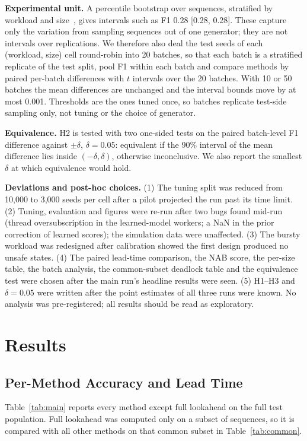 \documentclass[conference]{IEEEtran}
\begin{document}
\textbf{Experimental unit.} A percentile bootstrap over sequences, stratified by workload and size~\cite{Efron1993}, gives intervals such as F1 0.28 [0.28, 0.28]. These capture only the variation from sampling sequences out of one generator; they are not intervals over replications. We therefore also deal the test seeds of each (workload, size) cell round-robin into 20 batches, so that each batch is a stratified replicate of the test split, pool F1 within each batch and compare methods by paired per-batch differences with $t$ intervals over the 20 batches. With 10 or 50 batches the mean differences are unchanged and the interval bounds move by at most 0.001. Thresholds are the ones tuned once, so batches replicate test-side sampling only, not tuning or the choice of generator.

\textbf{Equivalence.} H2 is tested with two one-sided tests on the paired batch-level F1 difference against $\pm\delta$, $\delta=0.05$: equivalent if the 90\% interval of the mean difference lies inside $(-\delta,\delta)$, otherwise inconclusive. We also report the smallest $\delta$ at which equivalence would hold.

\textbf{Deviations and post-hoc choices.} (1) The tuning split was reduced from 10,000 to 3,000 seeds per cell after a pilot projected the run past its time limit. (2) Tuning, evaluation and figures were re-run after two bugs found mid-run (thread oversubscription in the learned-model workers; a NaN in the prior correction of learned scores); the simulation data were unaffected. (3) The bursty workload was redesigned after calibration showed the first design produced no unsafe states. (4) The paired lead-time comparison, the NAB score, the per-size table, the batch analysis, the common-subset deadlock table and the equivalence test were chosen after the main run's headline results were seen. (5) H1--H3 and $\delta=0.05$ were written after the point estimates of all three runs were known. No analysis was pre-registered; all results should be read as exploratory.

\section{Results}\label{sec:results}

\subsection{Per-Method Accuracy and Lead Time}\label{sec:res-accuracy}
Table~\ref{tab:main} reports every method except full lookahead on the full test population. Full lookahead was computed only on a subset of sequences, so it is compared with all other methods on that common subset in Table~\ref{tab:common}.
\end{document}
